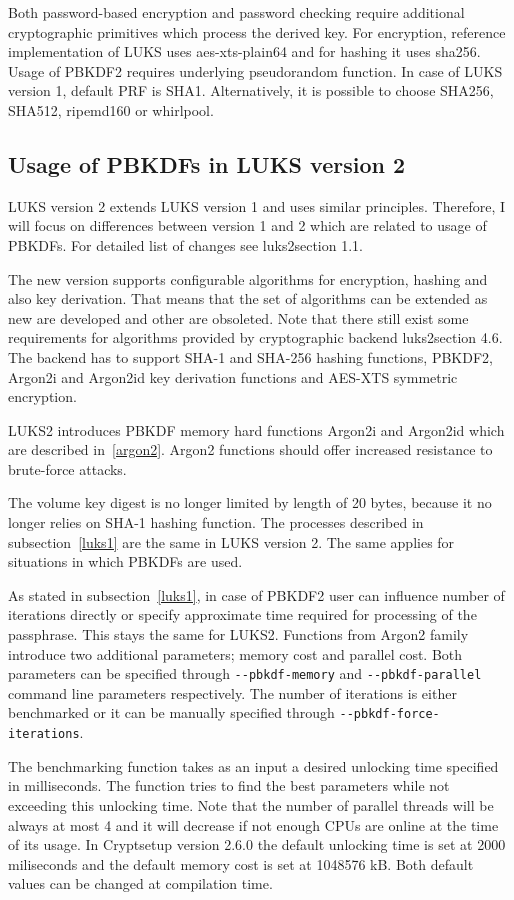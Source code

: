 \documentclass[nolof]{fithesis3}
\begin{document}
Both password-based encryption and password checking require additional cryptographic primitives which process the derived key. For encryption, reference implementation of LUKS uses aes-xts-plain64 and for hashing it uses sha256. Usage of PBKDF2 requires underlying pseudorandom function. In case of LUKS version 1, default PRF is SHA1. Alternatively, it is possible to choose SHA256, SHA512, ripemd160 or whirlpool.

\subsection{Usage of PBKDFs in LUKS version 2}
\label{luks2pbkdf}
LUKS version 2 extends LUKS version 1 and uses similar principles. Therefore, I will focus on differences between version 1 and 2 which are related to usage of PBKDFs. For detailed list of changes see \parencite{}{luks2}{section 1.1}.

The new version supports configurable algorithms for encryption, hashing and also key derivation. That means that the set of algorithms can be extended as new are developed and other are obsoleted. Note that there still exist some requirements for algorithms provided by cryptographic backend \parencite{}{luks2}{section 4.6}. The backend has to support SHA-1 and SHA-256 hashing functions, PBKDF2, Argon2i and Argon2id key derivation functions and AES-XTS symmetric encryption.

LUKS2 introduces PBKDF memory hard functions Argon2i and Argon2id which are described in~\ref{argon2}. Argon2 functions should offer increased resistance to brute-force attacks.

The volume key digest is no longer limited by length of 20 bytes, because it no longer relies on SHA-1 hashing function. The processes described in subsection~\ref{luks1} are the same in LUKS version 2. The same applies for situations in which PBKDFs are used. 

As stated in subsection~\ref{luks1},  in case of PBKDF2 user can influence number of iterations directly or specify approximate time required for processing of the passphrase. This stays the same for LUKS2. Functions from Argon2 family introduce two additional parameters; memory cost and parallel cost. Both parameters can be specified through \verb+--pbkdf-memory+ and \verb+--pbkdf-parallel+ command line parameters respectively. The number of iterations is either benchmarked or it can be manually specified through \verb+--pbkdf-force-iterations+.

The benchmarking function takes as an input a desired unlocking time specified in milliseconds. The function tries to find the best parameters while not exceeding this unlocking time. Note that the number of parallel threads will be always at most 4 and it will decrease if not enough CPUs are online at the time of its usage. In Cryptsetup version 2.6.0 the default unlocking time is set at 2000 miliseconds and the default memory cost is set at 1048576 kB. Both default values can be changed at compilation time.
\end{document}
